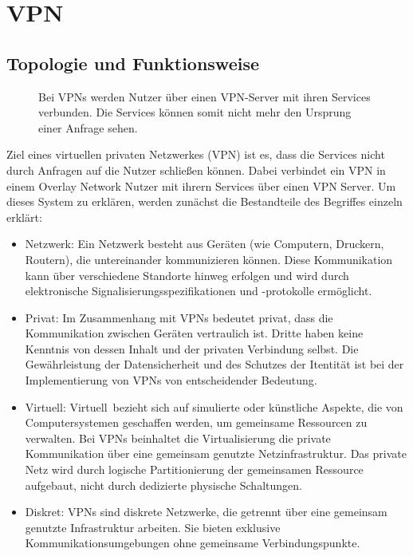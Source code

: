 \section{VPN}
\label{chap:vpn}

\subsection{Topologie und Funktionsweise}
\label{chap:vpn_topology}

\begin{figure}[h!]
    \centering
    
    \caption{Bei VPNs werden Nutzer über einen VPN-Server mit ihren Services verbunden. Die Services können somit nicht mehr den Ursprung einer Anfrage sehen.}
    \label{imgs:vpn}
\end{figure}

Ziel eines virtuellen privaten Netzwerkes (VPN) ist es, dass die Services nicht durch Anfragen auf die Nutzer schließen können. Dabei verbindet ein VPN in einem Overlay Network Nutzer mit ihrern Services über einen VPN Server. Um dieses System zu erklären, werden zunächst die Bestandteile des Begriffes einzeln erklärt:

\begin{itemize}
    \item Netzwerk: Ein Netzwerk besteht aus Geräten (wie Computern, Druckern, Routern), die untereinander kommunizieren können. Diese Kommunikation kann über verschiedene Standorte hinweg erfolgen und wird durch elektronische Signalisierungsspezifikationen und -protokolle ermöglicht.
    \item Privat: Im Zusammenhang mit VPNs bedeutet \glqq privat\grqq, dass die Kommunikation zwischen Geräten vertraulich ist. Dritte haben keine Kenntnis von dessen Inhalt und der privaten Verbindung selbst. Die Gewährleistung der Datensicherheit und des Schutzes der Itentität ist bei der Implementierung von VPNs von entscheidender Bedeutung.
    \item Virtuell: \glqq Virtuell\grqq\ bezieht sich auf simulierte oder künstliche Aspekte, die von Computersystemen geschaffen werden, um gemeinsame Ressourcen zu verwalten. Bei VPNs beinhaltet die Virtualisierung die private Kommunikation über eine gemeinsam genutzte Netzinfrastruktur. Das private Netz wird durch logische Partitionierung der gemeinsamen Ressource aufgebaut, nicht durch dedizierte physische Schaltungen.
    \item Diskret: VPNs sind diskrete Netzwerke, die getrennt über eine gemeinsam genutzte Infrastruktur arbeiten. Sie bieten exklusive Kommunikationsumgebungen ohne gemeinsame Verbindungspunkte.
\end{itemize}

